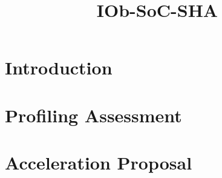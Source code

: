 \documentclass{plan}
\title{IOb-SoC-SHA}
\begin{document}
\maketitle
\cleardoublepage
\tableofcontents
\listoftables
\listoffigures
\cleardoublepage

\section{Introduction}
\label{sec:intro}


\section{Profiling Assessment}
\label{sec:profiling}


\section{Acceleration Proposal}
\label{sec:accel_proposal}

\end{document}
